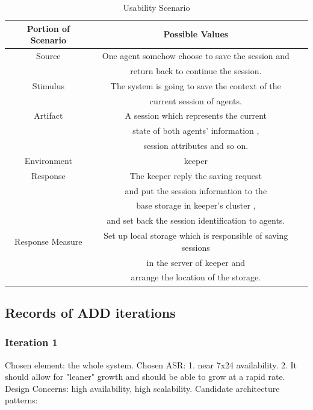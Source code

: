 \documentclass{article}
\begin{document}
	\begin{center}
		\begin{table}[!htb]
		\begin{tabular}{ccc}
		\toprule  
		Portion of Scenario & Possible Values\\
		\midrule 
		Source 				& One agent somehow choose to save the session and \\
							& return back to continue the session.\\
		Stimulus 			& The system is going to save the context of the \\
							& current session of agents.\\
		Artifact 			& A session which represents the current \\
							& state of both agents' information , \\
							& session attributes and so on.\\
		Environment 		& keeper \\
		Response 			& The keeper reply the saving request \\
							& and put the session information to the \\
							& base storage in keeper's cluster , \\
							& and set back the session identification to agents.\\
		Response Measure 	& Set up local storage which is responsible of saving sessions\\
							&  in the server of keeper and  \\
							& arrange the location of the storage.\\
		\bottomrule
		\end{tabular}
		\caption{Usability Scenario}
		\end{table}
	\end{center}

	\subsection{Records of ADD iterations}
		\subsubsection{Iteration 1}
		Chosen element: the whole system.
		Chosen ASR: 
		1. near 7x24 availability.
		2. It should allow for "leaner" growth and should be able to grow at a rapid rate.
		Design Concerns: high  availability, high scalability.
		Candidate architecture patterns:\\
\end{document}
